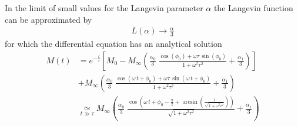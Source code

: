In the limit of small values for the Langevin parameter $\alpha$ the Langevin function can be approximated
by
\begin{align}
    L(\alpha) \rightarrow \frac{\alpha}{3}
\end{align}
for which the differential equation has an analytical solution
\begin{align}
M(t) &= e^{-\frac {t}{\tau}} \left[ M_0- M_{\infty}\left(\frac{\alpha_0}{3}\;\frac{
\cos \left( \phi_0 \right) +\omega\tau\, \sin\left( \phi_0 \right) }{1+{\omega}^{2}{\tau^{2}}}
+\frac{\alpha_1}{3}\right)\right] \nonumber \\
&+M_\infty \left(\frac{\alpha_0}{3} \; \frac{\cos \left( \omega\,t+\phi_0 \right) +
\omega\tau\,\sin \left( \omega\,t+\phi_0 \right) }{1+\omega^2\tau^2}+\frac{\alpha_1}{3}\right) \\
&\underset{t\gg\tau}{\simeq}
M_\infty \left(\frac{\alpha_0}{3} \; \frac{\cos \left( \omega\,t+\phi_0 -\frac{\pi}{2}+\arcsin\left(\frac{1}{\sqrt{1+\omega^2\tau^2}}\right)\right) }{\sqrt{1+\omega^2\tau^2}}+\frac{\alpha_1}{3}\right)
\end{align}

